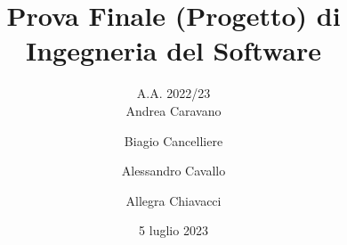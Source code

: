 \documentclass[aspectratio=1610,10.5pt]{beamer} %
\begin{document}
    \title{\textbf{Prova Finale (Progetto) di Ingegneria del Software}}
    \author{A.A. 2022/23\\Andrea Caravano\and Biagio Cancelliere\and Alessandro Cavallo\and Allegra Chiavacci}
    \date{5 luglio 2023}


    \begin{frame}
        \titlepage
    \end{frame}


    \logo{} %
\end{document}
